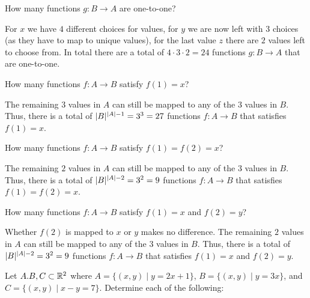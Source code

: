 \documentclass[a4paper, english, 12pt]{article} %
\begin{document}
\begin{subproblem}
  How many functions $g \colon B \to A$ are one-to-one?
\end{subproblem}

\begin{answer}
  For $x$ we have $4$ different choices for values, for $y$ we are now left with
  $3$ choices (as they have to map to unique values), for the last value $z$
  there are $2$ values left to choose from. In total there are a total of $4
  \cdot 3 \cdot 2 = 24$ functions $g \colon B \to A$ that are one-to-one.
\end{answer}

\begin{subproblem}
  How many functions $f \colon A \to B$ satisfy $f(1) = x$?
\end{subproblem}

\begin{answer}
  The remaining $3$ values in $A$ can still be mapped to any of the $3$ values
  in $B$. Thus, there is a total of $\lvert B\rvert^{\lvert A\rvert-1} = 3^3 = 27$ functions
  $f \colon A \to B$ that satisfies $f(1) = x$.
\end{answer}

\begin{subproblem}
  How many functions $f \colon A \to B$ satisfy $f(1) = f(2) = x$?
\end{subproblem}

\begin{answer}
  The remaining $2$ values in $A$ can still be mapped to any of the $3$ values
  in $B$. Thus, there is a total of $\lvert B\rvert^{\lvert A\rvert-2} = 3^2 = 9$ functions
  $f \colon A \to B$ that satisfies $f(1) = f(2) = x$.
\end{answer}

\begin{subproblem}
  How many functions $f \colon A \to B$ satisfy $f(1) = x$ and $f(2) = y$?
\end{subproblem}

\begin{answer}
  Whether $f(2)$ is mapped to $x$ or $y$ makes no difference. 
  The remaining $2$ values in $A$ can still be mapped to any of the $3$ values
  in $B$. Thus, there is a total of $\lvert B\rvert^{\lvert A\rvert-2} = 3^2 = 9$ functions
  $f \colon A \to B$ that satisfies $f(1) = x$ and $f(2) = y$.
\end{answer}

\begin{problem}[5]
  Let $A. B, C \subset \mathbb{R}^2$ where $A = \{(x,y) \mid y = 2x + 1\}$, $B = \{(x,y)
  \mid y = 3x\}$, and $C = \{(x, y) \mid x - y = 7\}$. Determine each of the following:
\end{problem}
\end{document}
